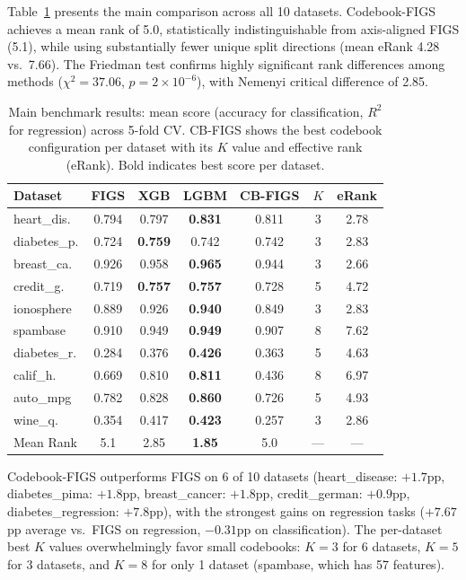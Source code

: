 \documentclass[11pt,letterpaper]{article}
\begin{document}
Table~\ref{tab:main_results} presents the main comparison across all 10 datasets. Codebook-FIGS achieves a mean rank of 5.0, statistically indistinguishable from axis-aligned FIGS (5.1), while using substantially fewer unique split directions (mean eRank 4.28 vs.\ 7.66). The Friedman test confirms highly significant rank differences among methods ($\chi^2 = 37.06$, $p = 2 \times 10^{-6}$), with Nemenyi critical difference of 2.85.

\begin{table}[!htbp]
\centering
\caption{Main benchmark results: mean score (accuracy for classification, $R^2$ for regression) across 5-fold CV. CB-FIGS shows the best codebook configuration per dataset with its $K$ value and effective rank (eRank). Bold indicates best score per dataset.}
\label{tab:main_results}
\small
\begin{tabular}{lcccccc}
\toprule
Dataset & FIGS & XGB & LGBM & CB-FIGS & $K$ & eRank \\
\midrule
heart\_dis.        & 0.794 & 0.797 & \textbf{0.831} & 0.811 & 3 & 2.78 \\
diabetes\_p.       & 0.724 & \textbf{0.759} & 0.742 & 0.742 & 3 & 2.83 \\
breast\_ca.        & 0.926 & 0.958 & \textbf{0.965} & 0.944 & 3 & 2.66 \\
credit\_g.         & 0.719 & \textbf{0.757} & \textbf{0.757} & 0.728 & 5 & 4.72 \\
ionosphere         & 0.889 & 0.926 & \textbf{0.940} & 0.849 & 3 & 2.83 \\
spambase           & 0.910 & 0.949 & \textbf{0.949} & 0.907 & 8 & 7.62 \\
diabetes\_r.       & 0.284 & 0.376 & \textbf{0.426} & 0.363 & 5 & 4.63 \\
calif\_h.          & 0.669 & 0.810 & \textbf{0.811} & 0.436 & 8 & 6.97 \\
auto\_mpg           & 0.782 & 0.828 & \textbf{0.860} & 0.726 & 5 & 4.93 \\
wine\_q.           & 0.354 & 0.417 & \textbf{0.423} & 0.257 & 3 & 2.86 \\
\midrule
Mean Rank          & 5.1   & 2.85  & \textbf{1.85}  & 5.0   & --- & --- \\
\bottomrule
\end{tabular}
\end{table}

Codebook-FIGS outperforms FIGS on 6 of 10 datasets (heart\_disease: $+1.7$pp, diabetes\_pima: $+1.8$pp, breast\_cancer: $+1.8$pp, credit\_german: $+0.9$pp, diabetes\_regression: $+7.8$pp), with the strongest gains on regression tasks ($+7.67$pp average vs.\ FIGS on regression, $-0.31$pp on classification). The per-dataset best $K$ values overwhelmingly favor small codebooks: $K = 3$ for 6 datasets, $K = 5$ for 3 datasets, and $K = 8$ for only 1 dataset (spambase, which has 57 features).
\end{document}
